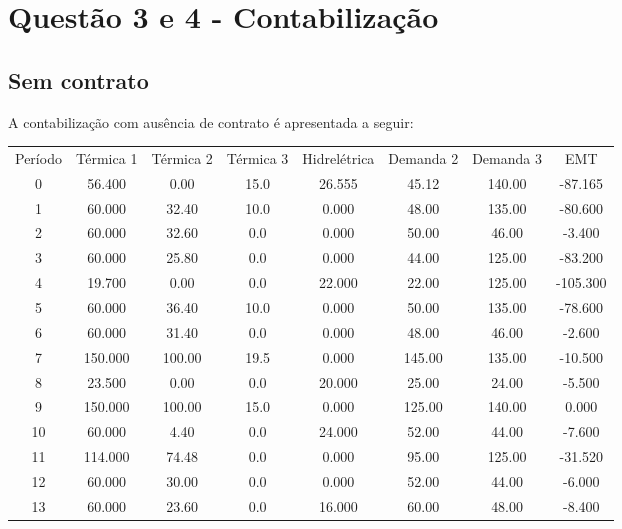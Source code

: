 \documentclass[a4paper,12pt,twoside]{article}
\begin{document}
\newpage

\section{Questão 3 e 4 - Contabilização}
\subsection{Sem contrato}
A contabilização com ausência de contrato é apresentada a seguir:

\begin{center}
    \begin{tabular}{ c c c c c c c c }
        Período & Térmica 1  & Térmica 2  & Térmica 3  & Hidrelétrica  & Demanda 2  & Demanda 3      & EMT \\
        0    & 56.400     & 0.00     & 15.0  & 26.555   & 45.12  & 140.00  & -87.165 \\
        1    & 60.000    & 32.40     & 10.0   & 0.000   & 48.00  & 135.00  & -80.600 \\
        2    & 60.000    & 32.60      & 0.0   & 0.000   & 50.00   & 46.00   & -3.400 \\
        3    & 60.000    & 25.80      & 0.0   & 0.000   & 44.00  & 125.00  & -83.200 \\
        4    & 19.700     & 0.00      & 0.0  & 22.000   & 22.00  & 125.00 & -105.300 \\
        5    & 60.000    & 36.40     & 10.0   & 0.000   & 50.00  & 135.00  & -78.600 \\
        6    & 60.000    & 31.40      & 0.0   & 0.000   & 48.00   & 46.00   & -2.600 \\
        7   & 150.000   & 100.00     & 19.5   & 0.000  & 145.00  & 135.00  & -10.500 \\
        8    & 23.500     & 0.00      & 0.0  & 20.000   & 25.00   & 24.00   & -5.500 \\
        9   & 150.000   & 100.00     & 15.0   & 0.000  & 125.00  & 140.00    & 0.000 \\
        10   & 60.000     & 4.40      & 0.0  & 24.000   & 52.00   & 44.00   & -7.600 \\
        11  & 114.000    & 74.48      & 0.0   & 0.000   & 95.00  & 125.00  & -31.520 \\
        12   & 60.000    & 30.00      & 0.0   & 0.000   & 52.00   & 44.00   & -6.000 \\
        13   & 60.000    & 23.60      & 0.0  & 16.000   & 60.00   & 48.00   & -8.400 \\

\end{tabular}
\end{center}
\end{document}
